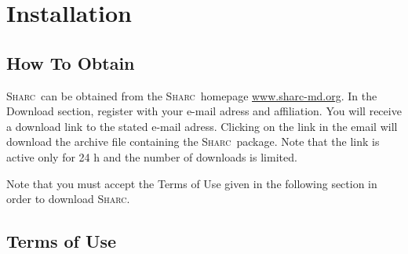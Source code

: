 \documentclass[a4paper,11pt,DIV=15,openany,twoside=false]{scrbook}
\newcommand{\sharc}{\textsc{Sharc}}
\begin{document}

\chapter{Installation}

\section{How To Obtain}

\sharc\ can be obtained from the \sharc\ homepage \href{http://sharc-md.org}{www.sharc-md.org}. In the Download section, register with your e-mail adress and affiliation. You will receive a download link to the stated e-mail adress. Clicking on the link in the email will download the archive file containing the \sharc\ package. Note that the link is active only for 24 h and the number of downloads is limited.

Note that you must accept the Terms of Use given in the following section in order to download \sharc.

\section{Terms of Use}

% 
% 
% 
% 
\end{document}
